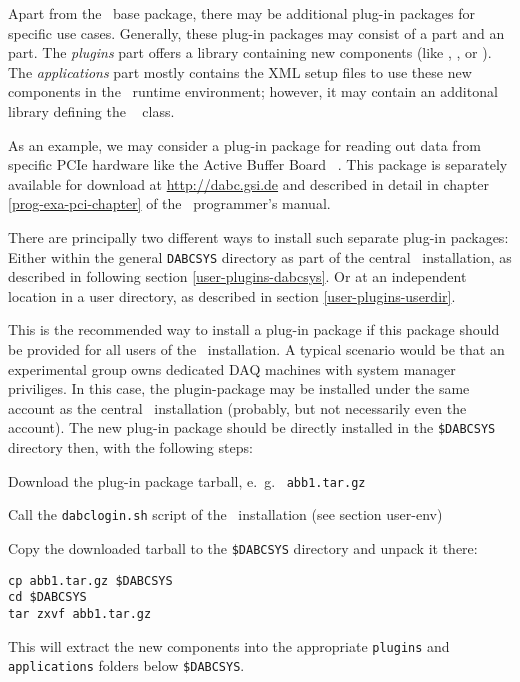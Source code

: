 Apart from the \dabc\ base package, there may be additional plug-in packages for
specific use cases. Generally, these plug-in packages may consist of a
 part and an  part.
The {\em plugins} part offers a library
containing new components (like , 
, or ). The {\em applications} part
mostly contains the XML setup files to use these new components in the
\dabc\ runtime environment; however, it 
may contain an additonal library defining the \dabc\ 
class.

As an example, we may consider a plug-in package for reading out data
from specific PCIe hardware like the Active Buffer Board \ABB\ \cite{AbbDescription}.
This package is separately available for download at \hyperref{http://dabc.gsi.de}{}{}{http://dabc.gsi.de}
and described in detail in chapter \ref{prog-exa-pci-chapter} of the \dabc\ programmer's manual.

There are principally two different ways to install such separate plug-in packages:
Either within the general {\tt DABCSYS} directory as part of the central \dabc\ installation, as
described in following section \ref{user-plugins-dabcsys}. Or at an independent location
in a user directory, as described in section \ref{user-plugins-userdir}.


This is the recommended way to install a plug-in package if this package should be provided
for all users of the \dabc\ installation. A typical scenario would be that an
experimental group owns dedicated DAQ machines with system manager priviliges.
In this case, the plugin-package may be installed under the same account as the
central \dabc\ installation (probably, but not necessarily even the  account).
The new plug-in package should be directly installed in the {\tt \$DABCSYS} directory
then, with the following steps:

\bnum
\item Download the plug-in package tarball, e.~g.~ {\tt abb1.tar.gz}

\item Call the {\tt dabclogin.sh} script of the \dabc\ installation (see section user-env)

\item Copy the downloaded tarball to the {\tt \$DABCSYS} directory and unpack it there:
\begin{verbatim}
cp abb1.tar.gz $DABCSYS
cd $DABCSYS
tar zxvf abb1.tar.gz
\end{verbatim} 
This will extract the new components into the appropriate {\tt plugins} and
{\tt applications} folders below {\tt \$DABCSYS}.

